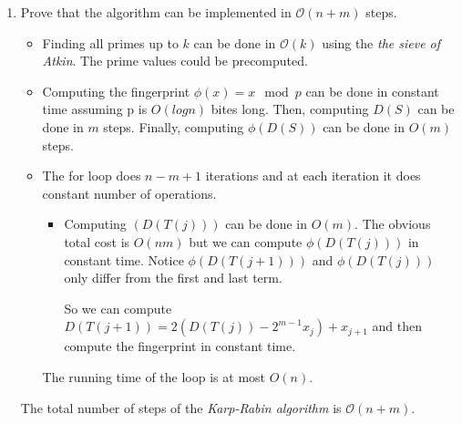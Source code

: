 \documentclass[12pt, a4paper]{article} %
\begin{document}
\begin{enumerate}[label=(\alph*)]
\begin{proof}
        \begin{align*}
          Pr[output match, when no match]& \\
          \leq Pr[p divides X] &= \frac{\#\{prime divisors of X\}}{\pi(k)} \\
                            &\leq  \frac{mn\ln(cmn\ln(mn))}{dcmn\ln(mn)} \\
                            &= \frac{1}{dc} + \frac{\ln(c)}{dc\ln(mn)} + \frac{\ln\ln(m n)}{dc\ln(mn)}
        \end{align*}

        Given a large enough c the right hand side can be made less than any fixed constant by basic calculus.

    \end{proof}


  \item  Prove that the algorithm can be implemented in $\mathcal{O}(n + m)$ steps.

    \begin{itemize}
        \item Finding all primes up to $k$ can be done in $\mathcal{O}(k)$ using the \textit{the sieve of Atkin}. The prime values could be precomputed.
        \item Computing the fingerprint $\phi(x) = x \mod p$ can be done in constant time assuming p is $O(log n)$ bites long. Then, computing $D(S)$ can be done in $m$ steps. Finally, computing $\phi(D(S))$ can be done in $O(m)$ steps.
        \item The for loop does $n - m + 1$ iterations and at each iteration it does constant number of operations.

        \begin{itemize}
          \item Computing $(D(T(j)))$ can be done in $O(m)$. The obvious total cost is $O(nm)$ but we can compute $\phi(D(T(j)))$ in constant time. Notice $\phi(D(T(j+1)))$ and $\phi(D(T(j)))$ only differ from the first and last term.

            So we can compute ${D(T(j+1)) = 2(D(T(j)) - 2^{m-1}x_{j}) + x_{j + 1}}$ and then compute the fingerprint in constant time.
        \end{itemize}

        The running time of the loop is at most $O(n)$.
    \end{itemize}

    The total number of steps of the \textit{Karp-Rabin algorithm} is $\mathcal{O}(n + m)$.

\end{enumerate}
\end{document}
